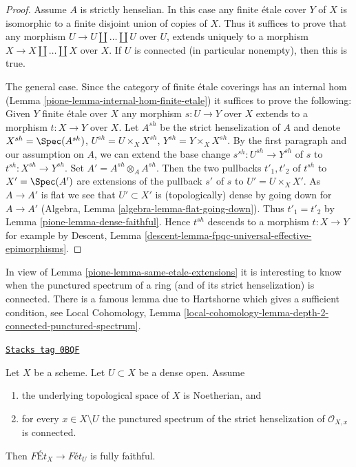 \begin{proof}

Assume $A$ is strictly henselian. In this case any finite \'etale
cover $Y$ of $X$ is isomorphic to a finite disjoint union of
copies of $X$. Thus it suffices to prove that any morphism
$U \to U \amalg \ldots \amalg U$ over $U$, extends uniquely to a morphism
$X \to X \amalg \ldots \amalg X$ over $X$.
If $U$ is connected (in particular nonempty), then this is true.

\medskip\noindent
The general case. Since the category of finite \'etale coverings has an
internal hom (Lemma \ref{pione-lemma-internal-hom-finite-etale})
it suffices to prove the following: Given $Y$ finite \'etale over $X$
any morphism $s : U \to Y$ over $X$ extends to a morphism $t : X \to Y$
over $X$. Let $A^{sh}$ be the strict henselization of $A$ and denote
$X^{sh} = \Spec(A^{sh})$, $U^{sh} = U \times_X X^{sh}$,
$Y^{sh} = Y \times_X X^{sh}$. By the first paragraph and our assumption
on $A$, we can extend the base change $s^{sh} : U^{sh} \to Y^{sh}$ of $s$ to
$t^{sh} : X^{sh} \to Y^{sh}$. Set $A' = A^{sh} \otimes_A A^{sh}$.
Then the two pullbacks $t'_1, t'_2$ of $t^{sh}$ to $X' = \Spec(A')$
are extensions of the pullback $s'$ of $s$ to $U' = U \times_X X'$.
As $A \to A'$ is flat we see that $U' \subset X'$ is (topologically) dense
by going down for $A \to A'$
(Algebra, Lemma \ref{algebra-lemma-flat-going-down}). Thus
$t'_1 = t'_2$ by Lemma \ref{pione-lemma-dense-faithful}.
Hence $t^{sh}$ descends to a morphism $t : X \to Y$
for example by
Descent, Lemma \ref{descent-lemma-fpqc-universal-effective-epimorphisms}.
\end{proof}

In view of Lemma \ref{pione-lemma-same-etale-extensions}
it is interesting to know when the
punctured spectrum of a ring (and of its strict henselization)
is connected. There is a famous lemma due to Hartshorne
which gives a sufficient condition, see
Local Cohomology, Lemma
\ref{local-cohomology-lemma-depth-2-connected-punctured-spectrum}.

\begin{lemma}
\label{pione-lemma-quasi-compact-dense-open-connected-at-infinity-Noetherian}
\href{https://stacks.math.columbia.edu/tag/0BQF}{\texttt{Stacks tag 0BQF}}

Let $X$ be a scheme. Let $U \subset X$ be a dense open. Assume
\begin{enumerate}
\item the underlying topological space of $X$ is Noetherian, and
\item for every $x \in X \setminus U$ the punctured spectrum of the
strict henselization of $\mathcal{O}_{X, x}$ is connected.
\end{enumerate}
Then $\textit{F\'Et}_X \to \textit{F\'et}_U$ is fully faithful.
\end{lemma}

